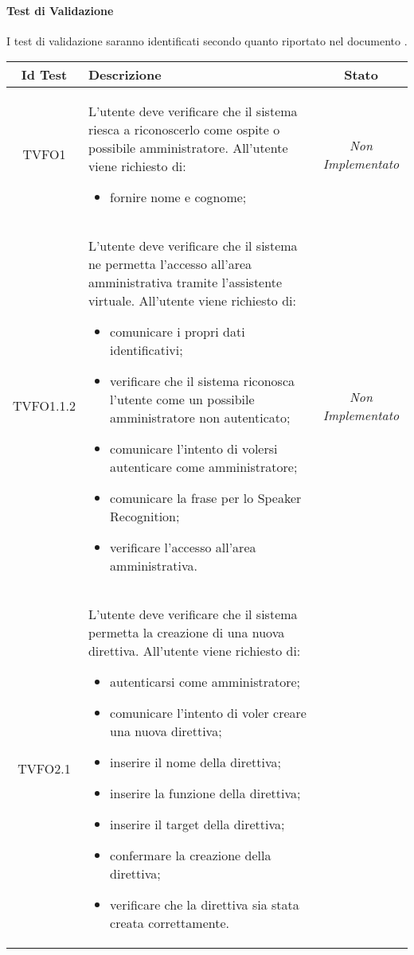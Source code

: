 \paragraph{Test di Validazione}
I test di validazione saranno identificati secondo quanto riportato nel documento \NPdoc{}.
\normalsize
\begin{longtable}{|c|>{}m{8cm}|c|}
\hline
\textbf{Id Test} & \textbf{Descrizione} & \textbf{Stato}\\
\hline
\endhead
\hypertarget{TVFO1}{TVFO1} & L'utente deve verificare che il sistema riesca a riconoscerlo come ospite o possibile amministratore. All'utente viene richiesto di:
\begin{itemize}
\item fornire nome e cognome;
\end{itemize} & \textit{Non Implementato}\\ \hline
\hypertarget{TVFO1.1.2}{TVFO1.1.2} & L'utente deve verificare che il sistema ne permetta l'accesso all'area amministrativa tramite l'assistente virtuale. All'utente viene richiesto di:
\begin{itemize}
\item comunicare i propri dati identificativi;
\item verificare che il sistema riconosca l'utente come un possibile amministratore non autenticato;
\item comunicare l'intento di volersi autenticare come amministratore;
\item comunicare la frase per lo Speaker Recognition;
\item verificare l'accesso all'area amministrativa.
\end{itemize} & \textit{Non Implementato}\\ \hline
\hypertarget{TVFO2.1}{TVFO2.1} & L'utente deve verificare che il sistema permetta la creazione di una nuova direttiva. All'utente viene richiesto di:
\begin{itemize}
\item autenticarsi come amministratore;
\item comunicare l'intento di voler creare una nuova direttiva;
\item inserire il nome della direttiva;
\item inserire la funzione della direttiva;
\item inserire il target della direttiva;
\item confermare la creazione della direttiva;
\item verificare che la direttiva sia stata creata correttamente.

\end{itemize}
\end{longtable}
